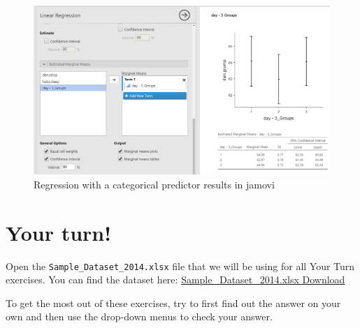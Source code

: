 \documentclass[
]{book}
\begin{document}
\begin{figure}

{\centering \includegraphics[width=1\linewidth]{images/13-regression/regression-categorical-EMM} 

}

\caption{Regression with a categorical predictor results in jamovi}\label{fig:unnamed-chunk-16}
\end{figure}

\hypertarget{your-turn-7}{%
\section{Your turn!}\label{your-turn-7}}

Open the \texttt{Sample\_Dataset\_2014.xlsx} file that we will be using for all Your Turn exercises. You can find the dataset here: \href{https://github.com/danawanzer/stats-with-jamovi/blob/master/data/Sample_Dataset_2014.xlsx}{Sample\_Dataset\_2014.xlsx Download}

To get the most out of these exercises, try to first find out the answer on your own and then use the drop-down menus to check your answer.
\end{document}
